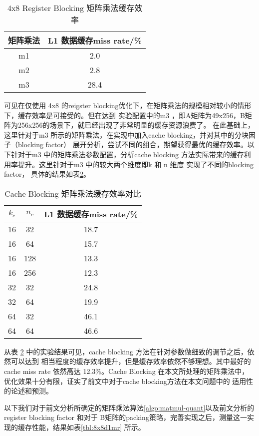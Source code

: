 \begin{table}[]
  \centering
  \caption{4x8 Register Blocking 矩阵乘法缓存效率}
  \begin{tabular}{cc}
    \toprule
    矩阵乘法 & L1 数据缓存miss rate/\% \\
    \midrule
    m1  & 2.0 \\
    m2  & 2.8 \\
    m3  & 28.4 \\
    \bottomrule
  \end{tabular}
  \label{tbl:4x8d1mr}
\end{table}

可见在仅使用 4x8 的reigster blocking优化下，在矩阵乘法的规模相对较小的情形下，缓存效率是可接受的。但在达到
实验配置中的m3 ，即A矩阵为49x256，B矩阵为256x256的场景下，就已经出现了非常明显的缓存资源浪费了。
在此基础上，这里针对于m3 所示的矩阵乘法，在实现中加入cache blocking，并对其中的分块因子（blocking factor）
展开分析，尝试不同的组合，期望获得最优的缓存效率。以下针对于m3 中的矩阵乘法参数配置，分析cache blocking
方法实际带来的缓存利用率提升。这里针对于m3 中的较大两个维度即k 和 n 维度
实现了不同的blocking factor， 具体的结果如表\ref{tbl:4x8cbd1mr}。


\begin{table}[]
  \centering
  \caption{Cache Blocking 矩阵乘法缓存效率对比}
  \begin{tabular}{ccc}
    \toprule
    $k_c$ & $n_c$ & L1 数据缓存miss rate/\% \\
    \midrule
    16 & 32 & 18.7 \\
    16 & 64 & 15.7 \\
    16 & 128 & 13.3 \\
    16 & 256 & 12.3 \\
    32 & 32 & 24.8 \\
    32 & 64 & 19.9 \\
    64 & 32 & 46.1 \\
    64 & 64 & 46.6 \\
    \bottomrule
  \end{tabular}
  \label{tbl:4x8cbd1mr}
\end{table}

从表 \ref{tbl:4x8cbd1mr} 中的实验结果可见，cache blocking 方法在针对参数做细致的调节之后，依然可以达到
相当程度的缓存效率提升，但是缓存效率依然不够理想。其中最好的cache miss rate 依然高达 12.3\%。Cache 
Blocking 在本文所处理的矩阵乘法中，优化效果十分有限，证实了前文中对于cache blocking方法在本文问题中的
适用性的论述和预测。

以下我们对于前文分析所确定的矩阵乘法算法\ref{algo:matmul-quant}以及前文分析的register blocking factor 和对于
B矩阵的packing策略，完善实现之后，测量这一实现的缓存性能，结果如表\ref{tbl:8x8d1mr} 所示。

